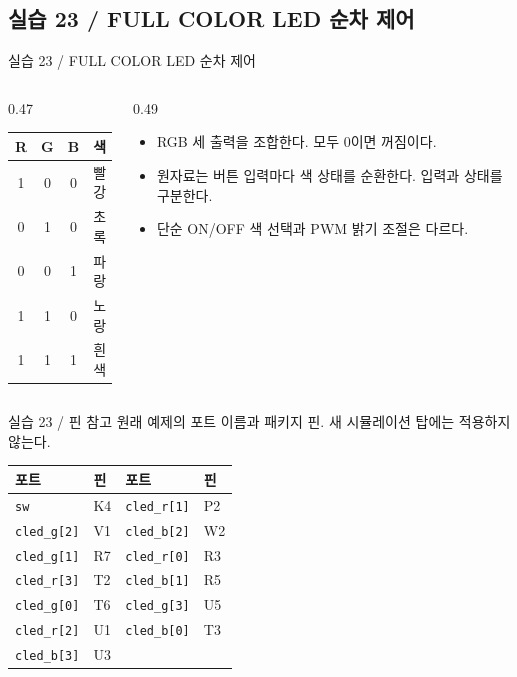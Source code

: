 \documentclass[aspectratio=169,11pt]{beamer}
\newcommand{\sourceref}[1]{}
\begin{document}
\subsection{실습 23 / FULL COLOR LED 순차 제어}
\begin{frame}[t]{실습 23 / FULL COLOR LED 순차 제어}
\small
\begin{columns}[T,onlytextwidth]\begin{column}{0.47\textwidth}\begin{center}\renewcommand{\arraystretch}{1.12}\begin{tabular}{cccc}\hline R & G & B & 색\\\hline 1 & 0 & 0 & 빨강\\
0 & 1 & 0 & 초록\\
0 & 0 & 1 & 파랑\\
1 & 1 & 0 & 노랑\\
1 & 1 & 1 & 흰색\\\hline\end{tabular}\end{center}\end{column}\begin{column}{0.49\textwidth}\begin{itemize}\setlength{\itemsep}{0.5em}\item RGB 세 출력을 조합한다. 모두 0이면 꺼짐이다.
\item 원자료는 버튼 입력마다 색 상태를 순환한다. 입력과 상태를 구분한다.
\item 단순 ON/OFF 색 선택과 PWM 밝기 조절은 다르다.\end{itemize}\end{column}\end{columns}
\sourceref{6.1\_PWM 회로 구현, p.34}
\end{frame}
\begin{frame}[t]{실습 23 / 핀 참고}
\fontsize{8}{9}\selectfont
원래 예제의 포트 이름과 패키지 핀. 새 시뮬레이션 탑에는 적용하지 않는다.
\begin{center}\renewcommand{\arraystretch}{1.0}
\begin{tabular}{ll@{\hspace{1.1cm}}ll}\toprule
포트 & 핀 & 포트 & 핀\\\midrule
\texttt{sw} & K4 & \texttt{cled\_r[1]} & P2 \\
\texttt{cled\_g[2]} & V1 & \texttt{cled\_b[2]} & W2 \\
\texttt{cled\_g[1]} & R7 & \texttt{cled\_r[0]} & R3 \\
\texttt{cled\_r[3]} & T2 & \texttt{cled\_b[1]} & R5 \\
\texttt{cled\_g[0]} & T6 & \texttt{cled\_g[3]} & U5 \\
\texttt{cled\_r[2]} & U1 & \texttt{cled\_b[0]} & T3 \\
\texttt{cled\_b[3]} & U3 & \texttt{} &  \\\bottomrule\end{tabular}\end{center}
{\scriptsize \par}
\sourceref{6.1\_PWM 회로 구현, p.46}\end{frame}
\end{document}
